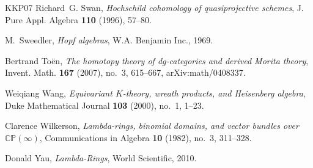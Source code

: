 \documentclass[12pt,a4paper,reqno]{amsart}
\begin{document}
\begin{thebibliography}{KKP07}
Richard~G. Swan, \emph{Hochschild cohomology of quasiprojective schemes}, J.
  Pure Appl. Algebra \textbf{110} (1996), 57--80.

M.~Sweedler, \emph{Hopf algebras}, W.A. Benjamin Inc., 1969.

Bertrand To{\"e}n, \emph{The homotopy theory of {\em dg}-categories and derived
  {M}orita theory}, Invent. Math. \textbf{167} (2007), no.~3, 615--667,
  arXiv:math/0408337.

Weiqiang Wang, \emph{{Equivariant $K$-theory, wreath products, and Heisenberg
  algebra}}, Duke Mathematical Journal \textbf{103} (2000), no.~1, 1--23.

Clarence Wilkerson, \emph{Lambda-rings, binomial domains, and vector bundles
  over $\mathbb{C}\mathbb{P}(\infty)$}, Communications in Algebra \textbf{10}
  (1982), no.~3, 311--328.

Donald Yau, \emph{Lambda-{R}ings}, World Scientific, 2010.

\end{thebibliography}
\end{document}
